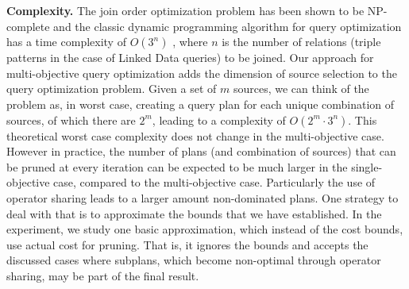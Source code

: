 \textbf{Complexity.} The join order optimization problem has been
shown to be NP-complete \cite{vance_rapid_1996} and the classic
dynamic programming algorithm for query optimization has a time
complexity of $O(3^n)$ \cite{kossmann_iterative_2000}, where $n$ is
the number of relations (triple patterns in the case of Linked Data
queries) to be joined. Our approach for multi-objective query
optimization adds the dimension of source selection to the query
optimization problem. Given a set of $m$ sources, we can think of the
problem as, in worst case, creating a query plan for each unique
combination of sources, of which there are $2^m$, leading to a
complexity of $O(2^m \cdot 3^n)$. This theoretical worst case complexity does not change in the multi-objective case. However in practice, the number of plans (and combination of sources) that can be pruned at every iteration can be expected to be much larger in the single-objective case, compared to the multi-objective case. Particularly the use of operator sharing leads to a larger amount non-dominated plans. One strategy to deal with that is to approximate the bounds that we have established. In the experiment, we study one basic approximation, which instead of the cost bounds, use actual cost for pruning. That is, it ignores the bounds and accepts the discussed cases where subplans, which become non-optimal through operator sharing, may be part of the final result. 




